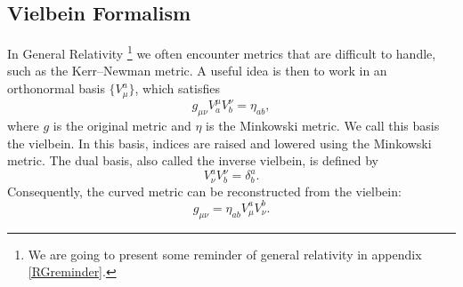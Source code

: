 \documentclass{article}
\begin{document}
\subsection{Vielbein Formalism} \label{spinconnexionvielbeinandflatspace}
In General Relativity \footnote{We are going to present some reminder of general relativity in appendix \ref{RGreminder}.} we often encounter metrics that are difficult to handle, such as the Kerr--Newman metric. A useful idea is then to work in an orthonormal basis $\{V^a_\mu \}$, which satisfies
\begin{equation} \label{vieldef}
    g_{\mu \nu} V^{\mu}_{a}V^{\nu}_b = \eta_{ab},
\end{equation}
where $g$ is the original metric and $\eta$ is the Minkowski metric.
We call this basis the vielbein. In this basis, indices are raised and lowered using the Minkowski metric.
The dual basis, also called the inverse vielbein, is defined by
\begin{equation} \label{inversviel}
    V^{a}_{\nu}V^{\nu}_b = \delta^a_b.
\end{equation}
Consequently, the curved metric can be reconstructed from the vielbein:
\begin{equation} \label{toflatmet}
    g_{\mu \nu} = \eta_{ab}V^{a}_{\mu}V^{b}_\nu.
\end{equation}
\end{document}
